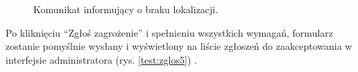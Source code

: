 \setlength{\fboxrule}{0.5pt}
\begin{figure}[H]
    \centering
    \caption{Komunikat informujący o braku lokalizacji.}
    \label{test:zglos4}
\end{figure}

Po kliknięciu “Zgłoś zagrożenie” i spełnieniu wszystkich wymagań, formularz zostanie pomyślnie wysłany i wyświetlony na liście zgłoszeń do zaakceptowania w interfejsie administratora (rys. \ref{test:zglos5}) . 

